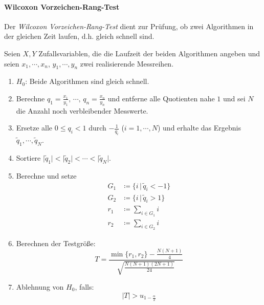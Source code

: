 \documentclass[a4paper, 11pt, accentcolor = tud3b]{tudreport}
\newcommand{\forwhich}{\ensuremath{{\,\vert\,}}}
\newcommand{\abs}[1]{\ensuremath{{\lvert #1 \rvert}}}
\begin{document}
            \paragraph{Wilcoxon Vorzeichen-Rang-Test}
                Der \textit{Wilcoxon Vorzeichen-Rang-Test} dient zur Prüfung, ob zwei Algorithmen in der gleichen Zeit laufen, d.h. gleich schnell sind.
                
                Seien \( X, Y \) Zufallsvariablen, die die Laufzeit der beiden Algorithmen angeben und seien \( x_1, \cdots, x_n \), \( y_1, \cdots, y_n \) zwei realisierende Messreihen.
                \begin{enumerate}
                	\item \(H_0\): \quad Beide Algorithmen sind gleich schnell.
                	\item Berechne \( q_1 = \frac{x_1}{y_1},\, \cdots,\, q_n = \frac{x_n}{y_n} \) und entferne alle Quotienten nahe \(1\) und sei \( N \) die Anzahl noch verbleibender Messwerte.
                	\item Ersetze alle \( 0 \leq q_i < 1 \) durch \( -\frac{1}{q_i} \) (\( i = 1, \cdots, N \)) und erhalte das Ergebnis \( \tilde{q}_1, \cdots, \tilde{q}_N \).
                	\item Sortiere \( \abs{\tilde{q}_1} < \abs{\tilde{q}_2} < \cdots < \abs{\tilde{q}_N} \).
                	\item Berechne und setze
	                	\begin{align*}
		                	G_1 &\coloneqq \{ i \forwhich \tilde{q}_i < -1 \} \tag{Algorithmus 1 schneller} \\
		                	G_2 &\coloneqq \{ i \forwhich \tilde{q}_i > 1 \} \tag{Algorithmus 2 schneller} \\
		                	r_1 &\coloneqq \sum_{i \in G_1} i \\
		                	r_2 &\coloneqq \sum_{i \in G_2} i
	                	\end{align*}
	                \item Berechnen der Testgröße:
		                \begin{equation*}
			                T = \frac{\min \{ r_1, r_2 \} - \frac{N(N + 1)}{4}}{\sqrt{\frac{N(N + 1)(2N + 1)}{24}}}
		                \end{equation*}
		            \item Ablehnung von \(H_0\), falls:
			            \begin{equation*}
				            \abs{T} > u_{1 - \frac{\alpha}{2}}
			            \end{equation*}
                \end{enumerate}
        
\end{document}
